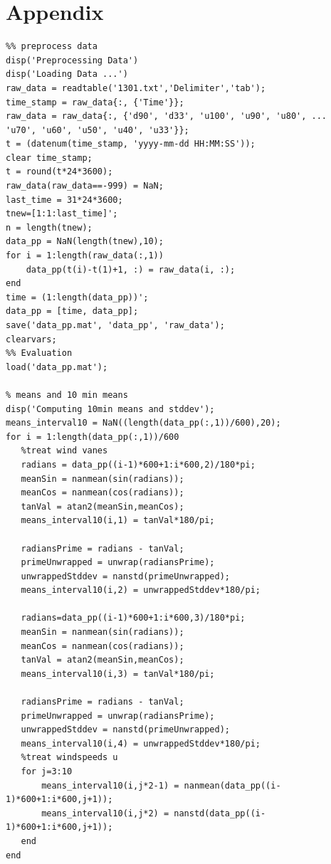 \documentclass[10pt]{article}
\begin{document}
\section{Appendix}
\begin{lstlisting}
%% preprocess data
disp('Preprocessing Data')
disp('Loading Data ...')
raw_data = readtable('1301.txt','Delimiter','tab');
time_stamp = raw_data{:, {'Time'}};
raw_data = raw_data{:, {'d90', 'd33', 'u100', 'u90', 'u80', ...
'u70', 'u60', 'u50', 'u40', 'u33'}};
t = (datenum(time_stamp, 'yyyy-mm-dd HH:MM:SS'));
clear time_stamp;
t = round(t*24*3600);
raw_data(raw_data==-999) = NaN;
last_time = 31*24*3600;
tnew=[1:1:last_time]';
n = length(tnew);
data_pp = NaN(length(tnew),10);
for i = 1:length(raw_data(:,1))
    data_pp(t(i)-t(1)+1, :) = raw_data(i, :);
end
time = (1:length(data_pp))';
data_pp = [time, data_pp];
save('data_pp.mat', 'data_pp', 'raw_data');
clearvars;
%% Evaluation
load('data_pp.mat');

% means and 10 min means
disp('Computing 10min means and stddev');  
means_interval10 = NaN((length(data_pp(:,1))/600),20);
for i = 1:length(data_pp(:,1))/600
   %treat wind vanes
   radians = data_pp((i-1)*600+1:i*600,2)/180*pi;
   meanSin = nanmean(sin(radians));
   meanCos = nanmean(cos(radians));
   tanVal = atan2(meanSin,meanCos);
   means_interval10(i,1) = tanVal*180/pi;
   
   radiansPrime = radians - tanVal;
   primeUnwrapped = unwrap(radiansPrime);
   unwrappedStddev = nanstd(primeUnwrapped);
   means_interval10(i,2) = unwrappedStddev*180/pi;

   radians=data_pp((i-1)*600+1:i*600,3)/180*pi;
   meanSin = nanmean(sin(radians));
   meanCos = nanmean(cos(radians));
   tanVal = atan2(meanSin,meanCos);
   means_interval10(i,3) = tanVal*180/pi;
   
   radiansPrime = radians - tanVal;
   primeUnwrapped = unwrap(radiansPrime);
   unwrappedStddev = nanstd(primeUnwrapped);
   means_interval10(i,4) = unwrappedStddev*180/pi;
   %treat windspeeds u 
   for j=3:10  
       means_interval10(i,j*2-1) = nanmean(data_pp((i-1)*600+1:i*600,j+1));
       means_interval10(i,j*2) = nanstd(data_pp((i-1)*600+1:i*600,j+1));
   end
end


\end{lstlisting}
\end{document}
